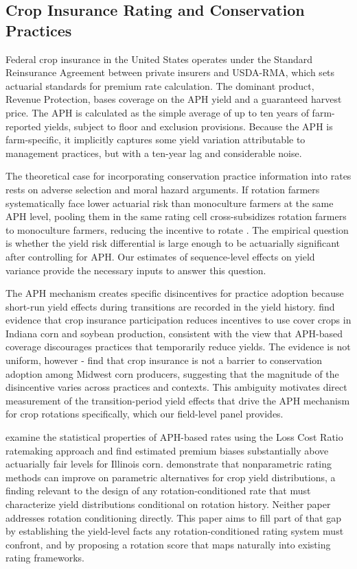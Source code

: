 \documentclass[12pt,letterpaper]{article}
\theoremstyle{remark}
\theoremstyle{remark}
\theoremstyle{plain}
\theoremstyle{definition}
\begin{document}
\subsection{\label{subsec:insurance_rating} Crop Insurance Rating and Conservation Practices}

Federal crop insurance in the United States operates under the Standard Reinsurance Agreement between private insurers and USDA-RMA, which sets actuarial standards for premium rate calculation. The dominant product, Revenue Protection, bases coverage on the APH yield and a guaranteed harvest price. The APH is calculated as the simple average of up to ten years of farm-reported yields, subject to floor and exclusion provisions. Because the APH is farm-specific, it implicitly captures some yield variation attributable to management practices, but with a ten-year lag and considerable noise.

The theoretical case for incorporating conservation practice information into rates rests on adverse selection and moral hazard arguments. If rotation farmers systematically face lower actuarial risk than monoculture farmers at the same APH level, pooling them in the same rating cell cross-subsidizes rotation farmers to monoculture farmers, reducing the incentive to rotate \citep{Ramaswami1993, Babcock1996}. The empirical question is whether the yield risk differential is large enough to be actuarially significant after controlling for APH. Our estimates of sequence-level effects on yield variance provide the necessary inputs to answer this question.

The APH mechanism creates specific disincentives for practice adoption because short-run yield effects during transitions are recorded in the yield history. \cite{Connor2022} find evidence that crop insurance participation reduces incentives to use cover crops in Indiana corn and soybean production, consistent with the view that APH-based coverage discourages practices that temporarily reduce yields. The evidence is not uniform, however - \cite{Fleckenstein2020} find that crop insurance is not a barrier to conservation adoption among Midwest corn producers, suggesting that the magnitude of the disincentive varies across practices and contexts. This ambiguity motivates direct measurement of the transition-period yield effects that drive the APH mechanism for crop rotations specifically, which our field-level panel provides.

\cite{Woodard2011} examine the statistical properties of APH-based rates using the Loss Cost Ratio ratemaking approach and find estimated premium biases substantially above actuarially fair levels for Illinois corn. \cite{Ker2000} demonstrate that nonparametric rating methods can improve on parametric alternatives for crop yield distributions, a finding relevant to the design of any rotation-conditioned rate that must characterize yield distributions conditional on rotation history. Neither paper addresses rotation conditioning directly. This paper aims to fill part of that gap by establishing the yield-level facts any rotation-conditioned rating system must confront, and by proposing a rotation score that maps naturally into existing rating frameworks.
\end{document}
